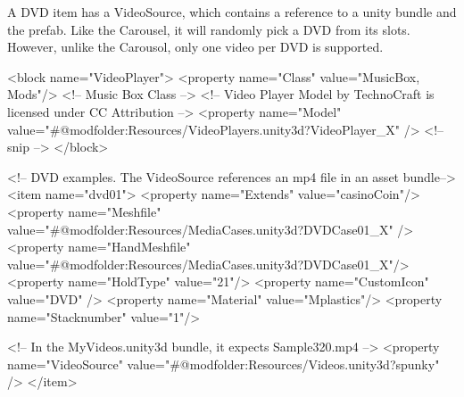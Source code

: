A D\+VD item has a Video\+Source, which contains a reference to a unity bundle and the prefab. Like the Carousel, it will randomly pick a D\+VD from its slots. However, unlike the Carousol, only one video per D\+VD is supported. \begin{DoxyVerb}<block name="VideoPlayer">
    <property name="Class" value="MusicBox, Mods"/>  <!-- Music Box Class -->
    <!-- Video Player Model by TechnoCraft is licensed under CC Attribution -->
    <property name="Model" value="#@modfolder:Resources/VideoPlayers.unity3d?VideoPlayer_X" />
    <!-- snip -->
</block>

<!-- DVD examples. The VideoSource references an mp4 file in an asset bundle-->
<item name="dvd01">
    <property name="Extends" value="casinoCoin"/>
    <property name="Meshfile" value="#@modfolder:Resources/MediaCases.unity3d?DVDCase01_X" /> 
    <property name="HandMeshfile" value="#@modfolder:Resources/MediaCases.unity3d?DVDCase01_X"/> 
    <property name="HoldType" value="21"/> 
    <property name="CustomIcon" value="DVD" />
    <property name="Material" value="Mplastics"/>
    <property name="Stacknumber" value="1"/>

    <!-- In the MyVideos.unity3d bundle, it expects  Sample320.mp4 -->
    <property name="VideoSource" value="#@modfolder:Resources/Videos.unity3d?spunky" />
</item>
\end{DoxyVerb}
 